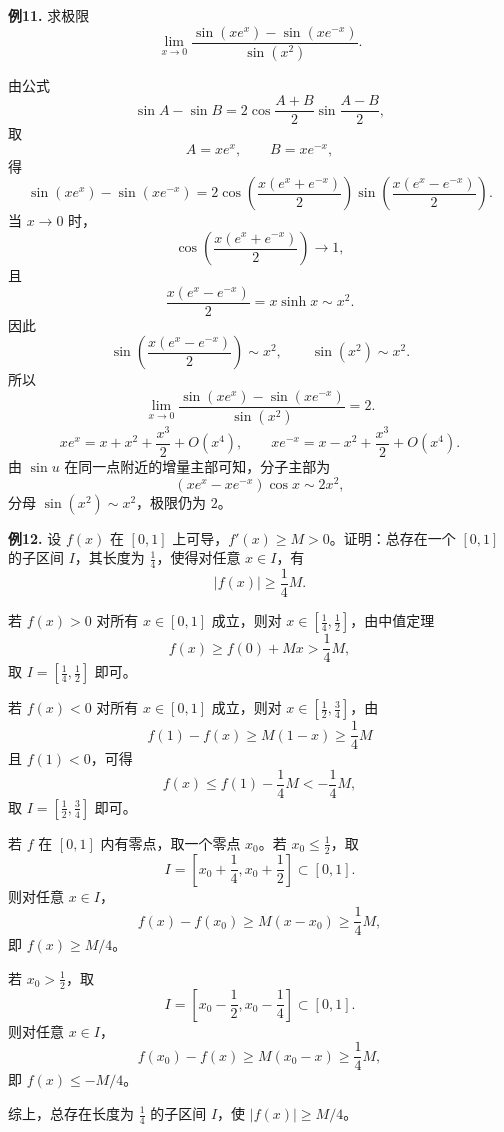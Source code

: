 \begin{problemblock}
\textbf{例11.} 求极限
\[
\lim_{x\to0}\frac{\sin(xe^x)-\sin(xe^{-x})}{\sin(x^2)}.
\]
\end{problemblock}
\begin{solutionblock}
由公式
\[
\sin A-\sin B=2\cos\frac{A+B}{2}\sin\frac{A-B}{2},
\]
取
\[
A=xe^x,\qquad B=xe^{-x},
\]
得
\[
\sin(xe^x)-\sin(xe^{-x})
=2\cos\left(\frac{x(e^x+e^{-x})}{2}\right)
\sin\left(\frac{x(e^x-e^{-x})}{2}\right).
\]
当 \(x\to0\) 时，
\[
\cos\left(\frac{x(e^x+e^{-x})}{2}\right)\to1,
\]
且
\[
\frac{x(e^x-e^{-x})}{2}
=x\sinh x\sim x^2.
\]
因此
\[
\sin\left(\frac{x(e^x-e^{-x})}{2}\right)\sim x^2,
\qquad
\sin(x^2)\sim x^2.
\]
所以
\[
\lim_{x\to0}\frac{\sin(xe^x)-\sin(xe^{-x})}{\sin(x^2)}=2.
\]
\[
xe^x=x+x^2+\frac{x^3}{2}+O(x^4),\qquad
xe^{-x}=x-x^2+\frac{x^3}{2}+O(x^4).
\]
由 \(\sin u\) 在同一点附近的增量主部可知，分子主部为
\[
(xe^x-xe^{-x})\cos x\sim 2x^2,
\]
分母 \(\sin(x^2)\sim x^2\)，极限仍为 \(2\)。
\end{solutionblock}

\begin{problemblock}
\textbf{例12.} 设 \(f(x)\) 在 \([0,1]\) 上可导，\(f'(x)\ge M>0\)。证明：总存在一个 \([0,1]\) 的子区间 \(I\)，其长度为 \(\frac14\)，使得对任意 \(x\in I\)，有
\[
|f(x)|\ge\frac14M.
\]
\end{problemblock}
\begin{solutionblock}
若 \(f(x)>0\) 对所有 \(x\in[0,1]\) 成立，则对 \(x\in\left[\frac14,\frac12\right]\)，由中值定理
\[
f(x)\ge f(0)+Mx>\frac14M,
\]
取 \(I=\left[\frac14,\frac12\right]\) 即可。

若 \(f(x)<0\) 对所有 \(x\in[0,1]\) 成立，则对 \(x\in\left[\frac12,\frac34\right]\)，由
\[
f(1)-f(x)\ge M(1-x)\ge \frac14M
\]
且 \(f(1)<0\)，可得
\[
f(x)\le f(1)-\frac14M<-\frac14M,
\]
取 \(I=\left[\frac12,\frac34\right]\) 即可。

若 \(f\) 在 \([0,1]\) 内有零点，取一个零点 \(x_0\)。若 \(x_0\le\frac12\)，取
\[
I=\left[x_0+\frac14,x_0+\frac12\right]\subset[0,1].
\]
则对任意 \(x\in I\)，
\[
f(x)-f(x_0)\ge M(x-x_0)\ge\frac14M,
\]
即 \(f(x)\ge M/4\)。

若 \(x_0>\frac12\)，取
\[
I=\left[x_0-\frac12,x_0-\frac14\right]\subset[0,1].
\]
则对任意 \(x\in I\)，
\[
f(x_0)-f(x)\ge M(x_0-x)\ge\frac14M,
\]
即 \(f(x)\le -M/4\)。

综上，总存在长度为 \(\frac14\) 的子区间 \(I\)，使 \(|f(x)|\ge M/4\)。
\end{solutionblock}

